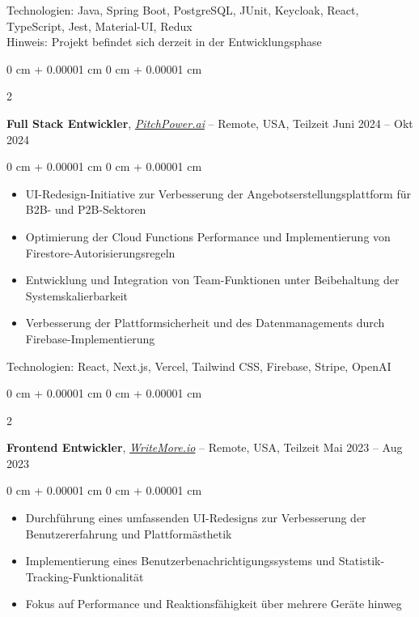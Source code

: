\documentclass[10pt, letterpaper]{article}
\newenvironment{highlights}{
    \begin{itemize}[
        topsep=0.10 cm,
        parsep=0.10 cm,
        partopsep=0pt,
        itemsep=0pt,
        leftmargin=0 cm + 10pt
    ]
}{
    \end{itemize}
} %
\newenvironment{onecolentry}{
    \begin{adjustwidth}{
        0 cm + 0.00001 cm
    }{
        0 cm + 0.00001 cm
    }
}{
    \end{adjustwidth}
} %
\newenvironment{twocolentry}[2][]{
    \onecolentry
    \def\secondColumn{#2}
    \setcolumnwidth{\fill, 4.5 cm}
    \begin{paracol}{2}
}{
    \switchcolumn \raggedleft \secondColumn
    \end{paracol}
    \endonecolentry
} %
\let\hrefWithoutArrow\href
\begin{document}
    \vspace{0.2 cm}
    Technologien: Java, Spring Boot, PostgreSQL, JUnit, Keycloak, React, TypeScript, Jest, Material-UI, Redux \\
    \vspace{0.1 cm}
    Hinweis: Projekt befindet sich derzeit in der Entwicklungsphase

    \vspace{0.3 cm}
    
    \begin{twocolentry}{
        Juni 2024 – Okt 2024
    }
        \textbf{Full Stack Entwickler}, \hrefWithoutArrow{https://pitchpower.ai/}{\textit{PitchPower.ai}} -- Remote, USA, Teilzeit\end{twocolentry}

    \vspace{0.20 cm}

    \begin{onecolentry}
        \begin{highlights}
            \item UI-Redesign-Initiative zur Verbesserung der Angebotserstellungsplattform für B2B- und P2B-Sektoren
            \item Optimierung der Cloud Functions Performance und Implementierung von Firestore-Autorisierungsregeln
            \item Entwicklung und Integration von Team-Funktionen unter Beibehaltung der Systemskalierbarkeit
            \item Verbesserung der Plattformsicherheit und des Datenmanagements durch Firebase-Implementierung
        \end{highlights}
    \end{onecolentry}

    \vspace{0.20 cm}
    Technologien: React, Next.js, Vercel, Tailwind CSS, Firebase, Stripe, OpenAI

    \vspace{0.3 cm}
    
    \begin{twocolentry}{
        Mai 2023 – Aug 2023
    }
        \textbf{Frontend Entwickler}, \hrefWithoutArrow{https://writemore.io/}{\textit{WriteMore.io}} -- Remote, USA, Teilzeit\end{twocolentry}

    \vspace{0.20 cm}

    \begin{onecolentry}
        \begin{highlights}
            \item Durchführung eines umfassenden UI-Redesigns zur Verbesserung der Benutzererfahrung und Plattformästhetik
            \item Implementierung eines Benutzerbenachrichtigungssystems und Statistik-Tracking-Funktionalität
            \item Fokus auf Performance und Reaktionsfähigkeit über mehrere Geräte hinweg
        \end{highlights}
    \end{onecolentry}
\end{document}
